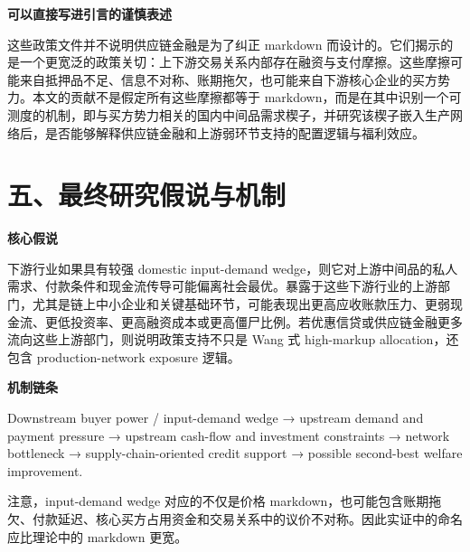 \documentclass[
  12pt,
]{ctexart}
\begin{document}
\textbf{可以直接写进引言的谨慎表述}

这些政策文件并不说明供应链金融是为了纠正 markdown 而设计的。它们揭示的是一个更宽泛的政策关切：上下游交易关系内部存在融资与支付摩擦。这些摩擦可能来自抵押品不足、信息不对称、账期拖欠，也可能来自下游核心企业的买方势力。本文的贡献不是假定所有这些摩擦都等于 markdown，而是在其中识别一个可测度的机制，即与买方势力相关的国内中间品需求楔子，并研究该楔子嵌入生产网络后，是否能够解释供应链金融和上游弱环节支持的配置逻辑与福利效应。

\section{五、最终研究假说与机制}\label{ux4e94ux6700ux7ec8ux7814ux7a76ux5047ux8bf4ux4e0eux673aux5236}

\textbf{核心假说}

下游行业如果具有较强 domestic input-demand wedge，则它对上游中间品的私人需求、付款条件和现金流传导可能偏离社会最优。暴露于这些下游行业的上游部门，尤其是链上中小企业和关键基础环节，可能表现出更高应收账款压力、更弱现金流、更低投资率、更高融资成本或更高僵尸比例。若优惠信贷或供应链金融更多流向这些上游部门，则说明政策支持不只是 Wang 式 high-markup allocation，还包含 production-network exposure 逻辑。

\textbf{机制链条}

Downstream buyer power / input-demand wedge → upstream demand and payment pressure → upstream cash-flow and investment constraints → network bottleneck → supply-chain-oriented credit support → possible second-best welfare improvement.

注意，input-demand wedge 对应的不仅是价格 markdown，也可能包含账期拖欠、付款延迟、核心买方占用资金和交易关系中的议价不对称。因此实证中的命名应比理论中的 markdown 更宽。
\end{document}
